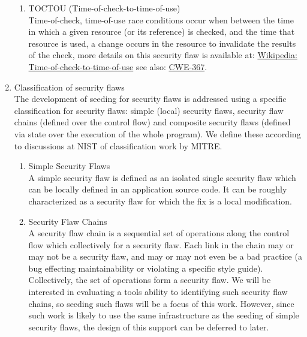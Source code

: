 \begin{enumerate}
\begin{enumerate}
         \item TOCTOU (Time-of-check-to-time-of-use) \\
               Time-of-check, time-of-use race conditions occur when between the time in
               which a given resource (or its reference) is checked, and the time that
               resource is used, a change occurs in the resource to invalidate the results
               of the check, more details on this security flaw is available at:
               \href{http://en.wikipedia.org/wiki/Time-of-check-to-time-of-use}{Wikipedia: Time-of-check-to-time-of-use}
               see also:
               \href{http://cwe.mitre.org/data/definitions/367.html}{CWE-367}.

      \end{enumerate}

   \item Classification of security flaws \\ 
         The development of seeding for security flaws is addressed using a specific 
         classification for security flaws: simple (local) security flaws, 
         security flaw chains (defined over the control flow) and composite security flaws
         (defined via state over the execution of the whole program).
         We define these according to discussions at NIST of classification work by MITRE.
      \begin{enumerate}
         \item Simple Security Flaws \\ 
               A simple security flaw is defined as an isolated single security flaw
               which can be locally defined in an application source code. It can be
               roughly characterized as a security flaw for which the fix is a local 
               modification.

         \item Security Flaw Chains \\ 
               A security flaw chain is a sequential set of operations along the control
               flow which collectively for a security flaw.  Each link in the chain may or
               may not be a security flaw, and may or may not even be a bad practice (a
               bug effecting maintainability or violating a specific style guide).
               Collectively, the set of operations form a security flaw.  We will be
               interested in evaluating a tools ability to identifying such security flaw 
               chains, so seeding such flaws will be a focus of this work. However,
               since such work is likely to use the same infrastructure as the 
               seeding of simple security flaws, the design of this support can be
               deferred to later.


\end{enumerate}
\end{enumerate}
